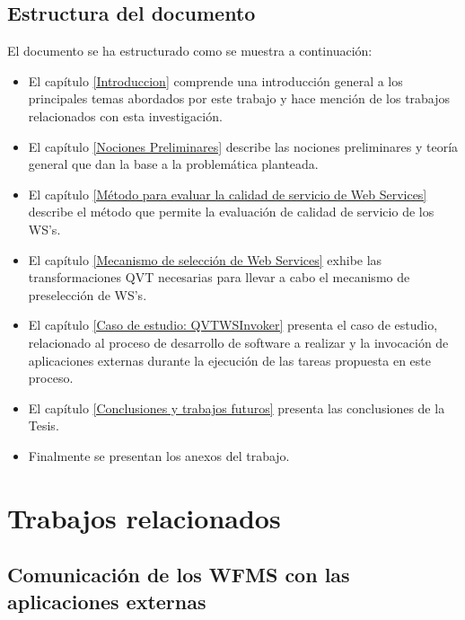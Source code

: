 \subsection{Estructura del documento}
\label{Estructura del documento}

El documento se ha estructurado como se muestra a continuación:
\begin{itemize}
	\item El capítulo \ref{Introduccion} comprende una introducción general a los principales temas abordados por este trabajo y hace mención de los trabajos relacionados con esta investigación.
	
	\item El capítulo \ref{Nociones Preliminares} describe las nociones preliminares y teoría general que dan la base a la problemática planteada.
	
	\item El capítulo \ref{Método para evaluar la calidad de servicio de Web Services} describe el método que permite la evaluación de calidad de servicio de los WS's.
	
	\item El capítulo \ref{Mecanismo de selección de Web Services} exhibe las transformaciones QVT necesarias para llevar a cabo el mecanismo de preselección de WS's. 
	
	\item El capítulo \ref{Caso de estudio: QVTWSInvoker} presenta el caso de estudio, relacionado al proceso de desarrollo de software a realizar y la invocación de aplicaciones externas durante la ejecución de las tareas propuesta en este proceso.
	
	\item El capítulo \ref{Conclusiones y trabajos futuros} presenta las conclusiones de la Tesis.
	
	\item Finalmente se presentan los anexos del trabajo.
	
\end{itemize}

 \section{Trabajos relacionados}
 \label{Trabajos relacionados}
 

\subsection{Comunicación de los WFMS con las aplicaciones externas}
\label{Comunicación de los WFMS con las aplicaciones externas}

